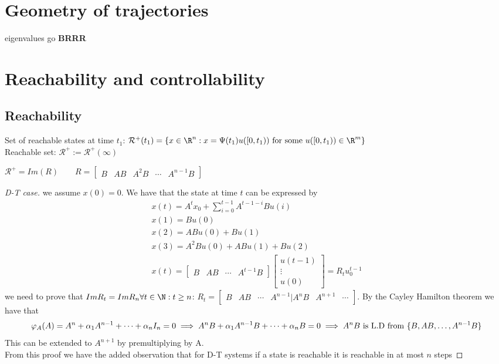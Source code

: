 \documentclass[english]{lectures}
\begin{document}
\chapter{Geometry of trajectories}
eigenvalues go \textbf{BRRR}














\chapter{Reachability and controllability}
\section{Reachability}
\begin{definition}[Reachability]
    Set of reachable states  at time $t_1$: \(\mathcal{R}^+(t_1)=\{x\in \R^n : x = \Psi(t_1)u([0,t_1)) \text{ for some }u([0,t_1)) \in \R^m\}\)\\
    Reachable set: \(\mathcal{R}^+:=\mathcal{R}^+(\infty)\)
\end{definition}
\begin{theorem}
    \(\mathcal{R}^+=Im(R) \qquad R=\begin{bmatrix}
        B & AB & A^2B & \cdots & A^{n-1}B
    \end{bmatrix}\)
\end{theorem}
\begin{proof}[D-T case]
    we assume \(x(0)=0\). We have that the state at time $t$ can be expressed by
    \begin{gather*}x(t)=A^tx_0+\sum_{i=0}^{t-1} A^{t-1-i}Bu(i)\\
    x(1)=Bu(0)\\
    x(2)=ABu(0)+Bu(1)\\
    x(3)=A^2Bu(0)+ABu(1)+Bu(2)\\
    x(t)=\begin{bmatrix}
        B & AB & \cdots & A^{t-1}B
    \end{bmatrix}\begin{bmatrix}
        u(t-1)\\\vdots\\u(0)
    \end{bmatrix} = R_tu_0^{t-1}
    \end{gather*}
    we need to prove that \(ImR_t=ImR_n \forall t \in \N:t\geq n\):
    \(R_t=\begin{bmatrix}
        B & AB & \cdots & A^{n-1} | A^nB & A^{n+1} & \cdots
    \end{bmatrix}\). By the Cayley Hamilton theorem we have that
    \[
    \varphi_A(A)=A^n+\alpha_1A^{n-1}+\dots+\alpha_nI_n=0 \implies A^nB+\alpha_1A^{n-1}B+\dots+\alpha_nB=0\\
    \implies A^nB \text{ is L.D from } \{B,AB,\dots,A^{n-1}B\}
    \]
    This can be extended to $A^{n+1}$ by premultiplying by A.\\
    From this proof we have the added observation that for D-T systems if a state is reachable it is reachable in at most $n$ steps
\end{proof}
\end{document}
